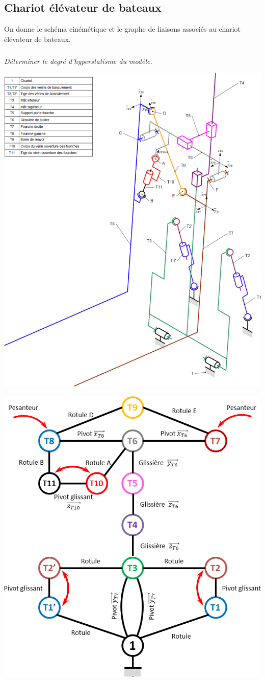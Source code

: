 \documentclass[10pt,fleqn]{article} %
\begin{document}
\begin{multicols}{2}
\section*{Chariot élévateur de bateaux}
On donne le schéma cinémétique et le graphe de liaisons associés au chariot élévateur de bateaux. 
\setcounter{exo}{0}
\subparagraph{}\textit{Déterminer le degré d'hyperstatisme du modèle.}
\begin{center}
\includegraphics[width=.8\linewidth]{images/fig_11.png}
\end{center}

\begin{center}
\includegraphics[width=.8\linewidth]{images/fig_12.png}
\end{center}


\end{multicols}
\end{document}
